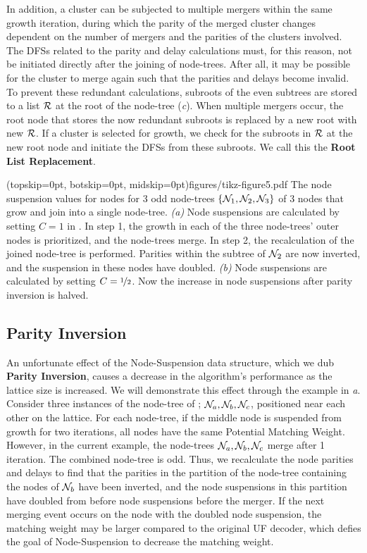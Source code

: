 In addition, a cluster can be subjected to multiple mergers within the same growth iteration, during which the parity of the merged cluster changes dependent on the number of mergers and the parities of the clusters involved. The DFSs related to the parity and delay calculations must, for this reason, not be initiated directly after the joining of node-trees. After all, it may be possible for the cluster to merge again such that the parities and delays become invalid. To prevent these redundant calculations, subroots of the even subtrees are stored to a list $\mathcal{R}$ at the root of the node-tree (\emph{c}). When multiple mergers occur, the root node that stores the now redundant subroots is replaced by a new root with new $\mathcal{R}$. If a cluster is selected for growth, we check for the subroots in $\mathcal{R}$ at the new root node and initiate the DFSs from these subroots. We call this the \textbf{Root List Replacement}. 

\Figure[htb](topskip=0pt, botskip=0pt, midskip=0pt){figures/tikz-figure5.pdf}{
    The node suspension values for nodes for 3 odd node-trees $\{\mathcal{N}_1, \mathcal{N}_2, \mathcal{N}_3\}$ of 3 nodes that grow and join into a single node-tree. \emph{(a)} Node suspensions are calculated by setting $C=1$ in . In step 1, the growth in each of the three node-trees' outer nodes is prioritized, and the node-trees merge. In step 2, the recalculation of the joined node-tree is performed. Parities within the subtree of $\mathcal{N}_2$ are now inverted, and the suspension in these nodes have doubled. \emph{(b)} Node suspensions are calculated by setting $C=\nicefrac{1}{2}$. Now the increase in node suspensions after parity inversion is halved.\label{fig5}}

\subsection{Parity Inversion}\label{sec:inversion}
An unfortunate effect of the Node-Suspension data structure, which we dub \textbf{Parity Inversion}, causes a decrease in the algorithm's performance as the lattice size is increased. We will demonstrate this effect through the example in \emph{a}. Consider three instances of the node-tree of ; $\mathcal{N}_a, \mathcal{N}_b, \mathcal{N}_c$, positioned near each other on the lattice. For each node-tree, if the middle node is suspended from growth for two iterations, all nodes have the same Potential Matching Weight. However, in the current example, the node-trees $\mathcal{N}_a, \mathcal{N}_b, \mathcal{N}_c$ merge after 1 iteration. The combined node-tree is odd. Thus, we recalculate the node parities and delays to find that the parities in the partition of the node-tree containing the nodes of $\mathcal{N}_b$ have been inverted, and the node suspensions in this partition have doubled from before node suspensions before the merger. If the next merging event occurs on the node with the doubled node suspension, the matching weight may be larger compared to the original UF decoder, which defies the goal of Node-Suspension to decrease the matching weight.

